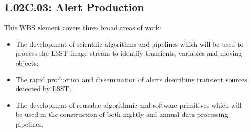 \subsection{1.02C.03: Alert Production}

This WBS element covers three broad areas of work:

\begin{itemize}

  \item{The development of scientific algorithms and pipelines which will be
  used to process the LSST image stream to identify transients, variables and
  moving objects;}

  \item{The rapid production and dissemination of alerts describing transient
  sources detected by LSST;}

  \item{The development of reusable algorithmic and software primitives which
  will be used in the construction of both nightly and annual data processing
  pipelines.}

\end{itemize}

